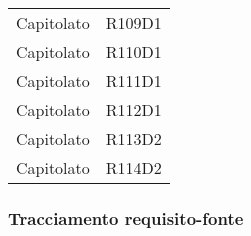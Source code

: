 \documentclass[../analisi-dei-requisiti.tex]{subfiles}
\begin{document}
\begin{longtable}[H]{c|c}
                                Capitolato & R109D1                               \\
                                Capitolato & R110D1                               \\
                                Capitolato & R111D1                               \\
                                Capitolato & R112D1                               \\
                                Capitolato & R113D2                               \\
                                Capitolato & R114D2                               \\
\end{longtable}

\subsubsection{Tracciamento requisito-fonte}
\label{sub:tracciamento_requisito-fonte}
\end{document}
